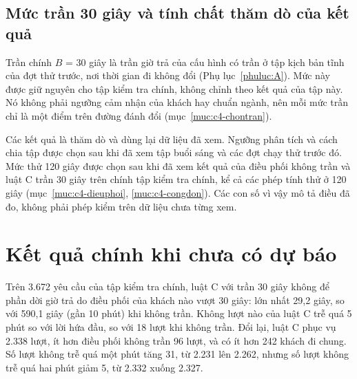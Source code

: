 
\subsection{Mức trần 30 giây và tính chất thăm dò của kết quả}
\label{muc:c4-thamdo}

Trần chính $B$ = 30 giây là trần giờ trả của cấu hình có trần ở tập kịch bản tĩnh của đợt thử trước, nơi thời gian đi
không đổi (Phụ lục~\ref{phuluc:A}). Mức này được giữ nguyên cho tập kiểm tra chính, không chỉnh theo kết quả của tập
này. Nó không phải ngưỡng cảm nhận của khách hay chuẩn ngành, nên mỗi mức trần chỉ là một điểm trên đường đánh đổi
(mục~\ref{muc:c4-chontran}).

Các kết quả là thăm dò và dùng lại dữ liệu đã xem. Ngưỡng phân tích và cách chia tập được chọn sau khi đã xem tập buổi
sáng và các đợt chạy thử trước đó. Mức thử 120 giây được chọn sau khi đã xem kết quả của điều phối không trần và luật
C trần 30 giây trên chính tập kiểm tra chính, kể cả các phép tính thử ở 120 giây (mục~\ref{muc:c4-dieuphoi},
\ref{muc:c4-congdon}). Các con số vì vậy mô tả điều đã đo, không phải phép kiểm trên dữ liệu chưa từng xem.

\section{Kết quả chính khi chưa có dự báo}
\label{muc:c4-ketqua}

Trên 3.672 yêu cầu của tập kiểm tra chính, luật C với trần 30 giây không để phần dời giờ trả do điều phối của khách
nào vượt 30 giây: lớn nhất 29,2 giây, so với 590,1 giây (gần 10 phút) khi không trần. Không lượt nào của luật C trễ
quá 5 phút so với lời hứa đầu, so với 18 lượt khi không trần. Đổi lại, luật C phục vụ 2.338 lượt, ít hơn điều phối
không trần 96 lượt, và có ít hơn 242 khách đi chung. Số lượt không trễ quá một phút tăng 31, từ 2.231 lên 2.262, nhưng
số lượt không trễ quá hai phút giảm 5, từ 2.332 xuống 2.327.

